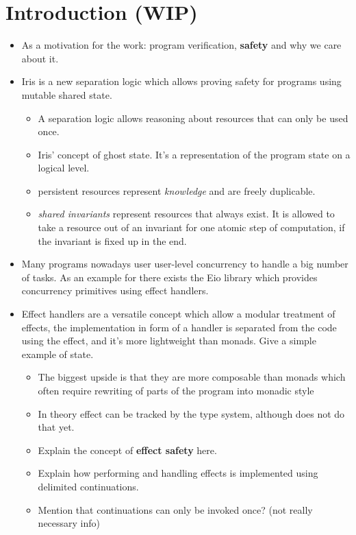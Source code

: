 \section{Introduction (WIP)}
\label{sec:introduction}

\begin{itemize}
  \item As a motivation for the work: program verification, \textbf{safety} and why we care about it.
  \item Iris is a new separation logic which allows proving safety for programs using mutable shared state.
        \begin{itemize}
          \item A separation logic allows reasoning about resources that can only be used once.
          \item Iris' concept of ghost state. It's a representation of the program state on a logical level.
          \item persistent resources represent \emph{knowledge} and are freely duplicable.
          \item \emph{shared invariants} represent resources that always exist. It is allowed to take a resource out of an invariant for one atomic step of computation, if the invariant is fixed up in the end.
        \end{itemize}
  \item Many programs nowadays user user-level concurrency to handle a big number of tasks. As an example for \ocf{} there exists the Eio library which provides concurrency primitives using effect handlers.
  \item Effect handlers are a versatile concept which allow a modular treatment of effects, the implementation in form of a handler is separated from the code using the effect, and it's more lightweight than monads. Give a simple example of state.
        \begin{itemize}
          \item The biggest upside is that they are more composable than monads which often require rewriting of parts of the program into monadic style
          \item In theory effect can be tracked by the type system, although \ocf{} does not do that yet.
          \item Explain the concept of \textbf{effect safety} here.
          \item Explain how performing and handling effects is implemented using delimited continuations.
          \item Mention that continuations can only be invoked once? (not really necessary info)

\end{itemize}
\end{itemize}
